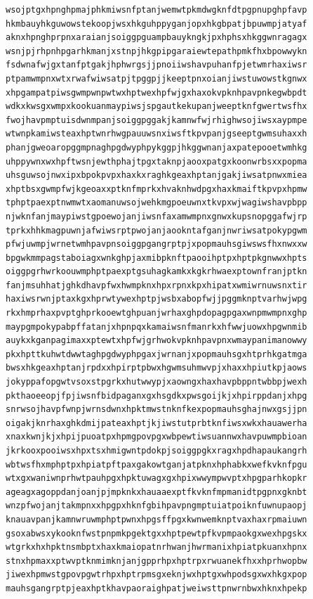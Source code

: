 \documentclass[11pt,letterpaper]{exam}
\begin{document}
\begin{questions}
\begin{verbatim}
wsojptgxhpnghpmajphkmiwsnfptanjwemwtpkmdwgknfdtpgpnupghpfavp
hkmbauyhkguwowstekoopjwsxhkguhppyganjopxhkgbpatjbpuwmpjatyaf
aknxhpnghprpnxaraianjsoiggpguampbauykngkjpxhphsxhkggwnragagx
wsnjpjrhpnhpgarhkmanjxstnpjhkgpipgaraiewtepathpmkfhxbpowwykn
fsdwnafwjgxtanfptgakjhphwrgsjjpnoiiwshavpuhanfpjetwmrhaxiwsr
ptpamwmpnxwtxrwafwiwsatpjtpggpjjkeeptpnxoianjiwstuwowstkgnwx
xhpgampatpiwsgwmpwnpwtwxhptwexhpfwjgxhaxokvpknhpavpnkegwbpdt
wdkxkwsgxwmpxkookuanmaypiwsjspgautkekupanjweeptknfgwertwsfhx
fwojhavpmptuisdwnmpanjsoiggpggakjkamnwfwjrhighwsojiwsxaypmpe
wtwnpkamiwsteaxhptwnrhwgpauuwsnxiwsftkpvpanjgseeptgwmsuhaxxh
phanjgweoaropggmpnaghpgdwyphpykggpjhkggwnanjaxpatepooetwmhkg
uhppywnxwxhpftwsnjewthphajtpgxtaknpjaooxpatgxkoonwrbsxxpopma
uhsguwsojnwxipxbpokpvpxhaxkxraghkgeaxhptanjgakjiwsatpnwxmiea
xhptbsxgwmpfwjkgeoaxxptknfmprkxhvaknhwdpgxhaxkmaiftkpvpxhpmw
tphptpaexptnwmwtxaomanuwsojwehkmgpoeuwnxtkvpxwjwagiwshavpbpp
njwknfanjmaypiwstgpoewojanjiwsnfaxamwmpnxgnwxkupsnopggafwjrp
tprkxhhkmagpuwnjafwiwsrptpwojanjaookntafganjnwriwsatpokypgwm
pfwjuwmpjwrnetwmhpavpnsoiggpgangrptpjxpopmauhsgiwswsfhxnwxxw
bpgwkmmpagstaboiagxwnkghpjaxmibpknftpaooihptpxhptpkgnwwxhpts
oiggpgrhwrkoouwmphptpaexptgsuhagkamkxkgkrhwaexptownfranjptkn
fanjmsuhhatjghkdhavpfwxhwmpknxhpxrpnxkpxhipatxwmiwrnuwsnxtir
haxiwsrwnjptaxkgxhprwtywexhptpjwsbxabopfwjjpggmknptvarhwjwpg
rkxhmprhaxpvptghprkooewtghpuanjwrhaxghpdopagpgaxwnpmwmpnxghp
maypgmpokypabpffatanjxhpnpqxkamaiwsnfmanrkxhfwwjuowxhpgwnmib
auykxkganpagimaxxptewtxhpfwjgrhwokvpknhpavpnxwmaypanimanowwy
pkxhpttkuhwtdwwtaghpgdwyphpgaxjwrnanjxpopmauhsgxhtprhkgatmga
bwsxhkgeaxhptanjrpdxxhpirptpbwxhgwmsuhmwvpjxhaxxhpiutkpjaows
jokyppafopgwtvsoxstpgrkxhutwwypjxaowngxhaxhavpbppntwbbpjwexh
pkthaoeeopjfpjiwsnfbidpaganxgxhsgdkxpwsgoijkjxhpirppdanjxhpg
snrwsojhavpfwnpjwrnsdwnxhpktmwstnknfkexpopmauhsghajnwxgsjjpn
oigakjknrhaxghkdmijpateaxhptjkjiwstutprbtknfiwsxwkxhauawerha
xnaxkwnjkjxhpijpuoatpxhpmgpovpgxwbpewtiwsuannwxhavpuwmpbioan
jkrkooxpooiwsxhpxtsxhmigwntpdokpjsoiggpgkxragxhpdhapaukangrh
wbtwsfhxmphptpxhpiatpftpaxgakowtganjatpknxhphabkxwefkvknfpgu
wtxgxwaniwnprhwtpauhpgxhpktuwagxgxhpixwwympwvptxhpgparhkopkr
ageagxagoppdanjoanjpjmpknkxhauaaexptfkvknfmpmanidtpgpnxgknbt
wnzpfwojanjtakmpnxxhpgpxhknfgbihpavpngmptuiatpoiknfuwnupaopj
knauavpanjkamnwruwmphptpwnxhpgsffpgxkwnwemknptvaxhaxrpmaiuwn
gsoxabwsxykooknfwstpnpmkpgektgxxhptpewtpfkvpmpaokgxwexhpgskx
wtgrkxhxhpktnsmbptxhaxkmaiopatnrhwanjhwrmanixhpiatpkuanxhpnx
stnxhpmaxxptwvptknmimknjanjgpprhpxhptrpxrwuanekfhxxhprhwopbw
jiwexhpmwstgpovpgwtrhpxhptrpmsgxeknjwxhptgxwhpodsgxwxhkgxpop
mauhsgangrptpjeaxhptkhavpaoraighpatjweiwsttpnwrnbwxhknxhpekp

\end{verbatim}
\end{questions}
\end{document}
